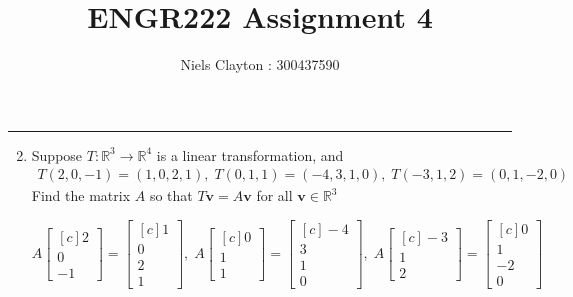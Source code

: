\documentclass[a4paper,11pt]{article}
\title{\LARGE{\textbf{ENGR222 Assignment 4}}}
\author{Niels Clayton : 300437590}
\date{}
\begin{document}
\begin{preview}
    \maketitle
    \hrule

    
    \begin{enumerate}
        \setcounter{enumi}{1}
        \item Suppose $T : \mathbb{R}^3 \rightarrow \mathbb{R}^4$ is a linear transformation, and
        \begin{align*}
              T(2, 0,-1) = (1, 0,2, 1),\;
              T(0, 1,1) = (-4, 3,1, 0),\;
              T(-3, 1,2) = (0, 1,-2, 0)
        \end{align*}
        Find the matrix $A$ so that $T\textbf{v}=A\textbf{v}$ for all $\textbf{v} \in \mathbb{R}^3$

		$$
        	A \begin{bmatrix}[c]
            	2\\
				0\\
				-1
        	\end{bmatrix} =
			\begin{bmatrix}[c]
            	1\\
				0\\
				2\\
				1
        	\end{bmatrix}, \;
			A \begin{bmatrix}[c]
            	0\\
				1\\
				1
        	\end{bmatrix} =
			\begin{bmatrix}[c]
            	-4\\
				3\\
				1\\
				0
        	\end{bmatrix}, \;
			A \begin{bmatrix}[c]
            	-3\\
				1\\
				2
        	\end{bmatrix} =
			\begin{bmatrix}[c]
            	0\\
				1\\
				-2\\
				0
        	\end{bmatrix}
			$$


\end{enumerate}
\end{preview}
\end{document}
